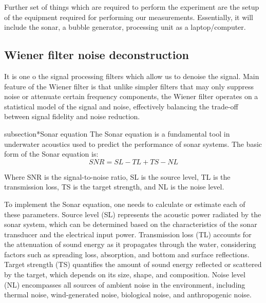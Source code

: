 \documentclass[11pt]{article}
\begin{document}
Further set of things which are required to perform the experiment are the setup of the equipment required for performing our measurements. 
Essentially, it will include the sonar, a bubble generator, processing unit as a laptop/computer.

\subsection*{Wiener filter noise deconstruction}

It is one o the signal processing filters which allow us to denoise the signal. Main feature of the Wiener filter is 
that unlike simpler filters that may only suppress noise or attenuate certain frequency components, the Wiener filter operates on a statistical model of the signal and noise, effectively balancing the trade-off between signal fidelity and noise reduction.

subsection*{Sonar equation }
The Sonar equation is a fundamental tool in underwater acoustics used to predict the performance of sonar systems. 
The basic form of the Sonar equation is:
\begin{equation}
    SNR=SL-TL+TS-NL
\end{equation}

Where
SNR is the signal-to-noise ratio,
SL is the source level,
TL is the transmission loss,
TS is the target strength, and
NL is the noise level.

To implement the Sonar equation, one needs to calculate or estimate each of these parameters. 
Source level (SL) represents the acoustic power radiated by the sonar system, which can be determined based on the characteristics of the sonar transducer and the electrical input power. 
Transmission loss (TL) accounts for the attenuation of sound energy as it propagates through the water, considering factors such as spreading loss, absorption, and bottom and surface reflections. 
Target strength (TS) quantifies the amount of sound energy reflected or scattered by the target, which depends on its size, shape, and composition. 
Noise level (NL) encompasses all sources of ambient noise in the environment, including thermal noise, wind-generated noise, biological noise, and anthropogenic noise.


\end{document}
